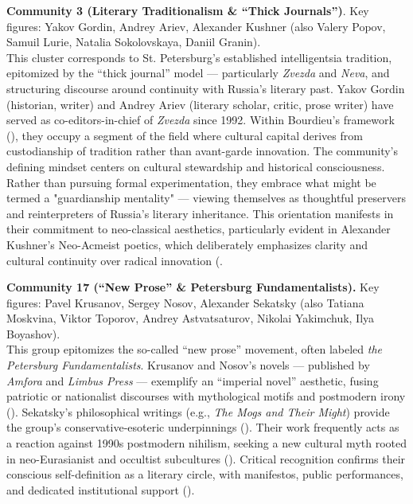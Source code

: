 \documentclass{jcls}
\begin{document}
\textbf{Community 3 (Literary Traditionalism & “Thick Journals”)}. Key figures: Yakov Gordin, Andrey Ariev, Alexander Kushner (also Valery Popov, Samuil Lurie, Natalia Sokolovskaya, Daniil Granin). \\
This cluster corresponds to St. Petersburg’s established intelligentsia tradition, epitomized by the “thick journal” model — particularly \textit{Zvezda} and \textit{Neva}, and structuring discourse around continuity with Russia’s literary past. Yakov Gordin (historian, writer) and Andrey Ariev (literary scholar, critic, prose writer) have served as co-editors-in-chief of \textit{Zvezda} since 1992. Within Bourdieu’s framework (\cite{bourdieu1983}), they occupy a segment of the field where cultural capital derives from custodianship of tradition rather than avant-garde innovation. The community's defining mindset centers on cultural stewardship and historical consciousness. Rather than pursuing formal experimentation, they embrace what might be termed a "guardianship mentality" — viewing themselves as thoughtful preservers and reinterpreters of Russia's literary inheritance. This orientation manifests in their commitment to neo-classical aesthetics, particularly evident in Alexander Kushner's Neo-Acmeist poetics, which deliberately emphasizes clarity and cultural continuity over radical innovation (\cite{arev2019}. 

\textbf{Community 17 (“New Prose” & Petersburg Fundamentalists).} Key figures: Pavel Krusanov, Sergey Nosov, Alexander Sekatsky (also Tatiana Moskvina, Viktor Toporov, Andrey Astvatsaturov, Nikolai Yakimchuk, Ilya Boyashov). \\
This group epitomizes the so-called “new prose” movement, often labeled \textit{the Petersburg Fundamentalists}. Krusanov and Nosov’s novels — published by \textit{Amfora} and \textit{Limbus Press} — exemplify an “imperial novel” aesthetic, fusing patriotic or nationalist discourses with mythological motifs and postmodern irony (\cite{fenghi2023}). Sekatsky’s philosophical writings (e.g., \textit{The Mogs and Their Might}) provide the group’s conservative‐esoteric underpinnings (\cite{fenghi2023}). Their work frequently acts as a reaction against 1990s postmodern nihilism, seeking a new cultural myth rooted in neo-Eurasianist and occultist subcultures (\cite{lipovetsky2008, noordenbos2011}). Critical recognition confirms their conscious self-definition as a literary circle, with manifestos, public performances, and dedicated institutional support (\cite{fenghi2023,noordenbos2011}).
\end{document}
